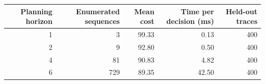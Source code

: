 \begin{tabular}{rrrrr}
\toprule
Planning horizon & Enumerated sequences & Mean cost & Time per decision (ms) & Held-out traces \\
\midrule
1 & 3 & 99.33 & 0.13 & 400 \\
2 & 9 & 92.80 & 0.50 & 400 \\
4 & 81 & 90.83 & 4.82 & 400 \\
6 & 729 & 89.35 & 42.50 & 400 \\
\bottomrule
\end{tabular}